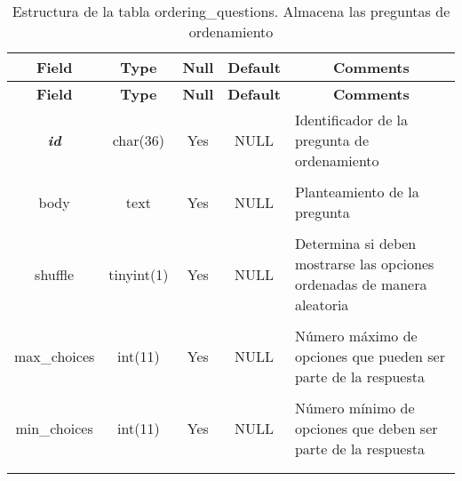 %
%
\begin{longtable}{c c c c l}
	\multicolumn{1}{c}{\textbf{Field}} &
	\multicolumn{1}{c}{\textbf{Type}} &
	\multicolumn{1}{c}{\textbf{Null}} &
	\multicolumn{1}{c}{\textbf{Default}} &
	\multicolumn{1}{c}{\textbf{Comments}} \\ \hline \hline
\endfirsthead
	\multicolumn{1}{c}{\textbf{Field}} &
	\multicolumn{1}{c}{\textbf{Type}} &
	\multicolumn{1}{c}{\textbf{Null}} &
	\multicolumn{1}{c}{\textbf{Default}} &
	\multicolumn{1}{c}{\textbf{Comments}} \\ \hline \hline
\endhead \endfoot
	\textbf{\textit{id}} & char(36) & Yes & NULL & \parbox[t]{0.35\textwidth}{Identificador de la pregunta de ordenamiento} \\ \\  \hline
	body & text & Yes & NULL & \parbox[t]{0.35\textwidth}{Planteamiento de la pregunta} \\ \\  \hline
	shuffle & tinyint(1) & Yes & NULL & \parbox[t]{0.35\textwidth}{Determina si deben mostrarse las opciones ordenadas de manera aleatoria} \\ \\  \hline
	max\_choices & int(11) & Yes & NULL & \parbox[t]{0.35\textwidth}{Número máximo de opciones que pueden ser parte de la respuesta} \\ \\  \hline
	min\_choices & int(11) & Yes & NULL & \parbox[t]{0.35\textwidth}{Número mínimo de opciones que deben ser parte de la respuesta} \\ \\  \hline
 \caption[Estructura de la tabla ordering\_questions]{Estructura de la tabla ordering\_questions. Almacena las preguntas de ordenamiento} \label{tab:quiz_ordering_questions-structure} \\
\end{longtable}

